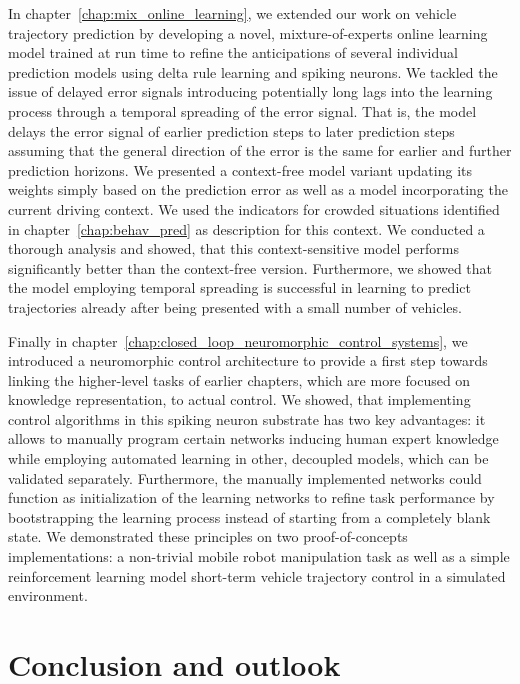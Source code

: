 In chapter~\ref{chap:mix_online_learning}, we extended our work on vehicle trajectory prediction by developing a novel, mixture-of-experts online learning model trained at run time to refine the anticipations of several individual prediction models using delta rule learning and spiking neurons.
We tackled the issue of delayed error signals introducing potentially long lags into the learning process through a temporal spreading of the error signal.
That is, the model delays the error signal of earlier prediction steps to later prediction steps assuming that the general direction of the error is the same for earlier and further prediction horizons.
We presented a context-free model variant updating its weights simply based on the prediction error as well as a model incorporating the current driving context.
We used the indicators for crowded situations identified in chapter~\ref{chap:behav_pred} as description for this context.
We conducted a thorough analysis and showed, that this context-sensitive model performs significantly better than the context-free version.
Furthermore, we showed that the model employing temporal spreading is successful in learning to predict trajectories already after being presented with a small number of vehicles.

Finally in chapter~\ref{chap:closed_loop_neuromorphic_control_systems}, we introduced a neuromorphic control architecture to provide a first step towards linking the higher-level tasks of earlier chapters, which are more focused on knowledge representation, to actual control. 
We showed, that implementing control algorithms in this spiking neuron substrate has two key advantages: it allows to manually program certain networks inducing human expert knowledge while employing automated learning in other, decoupled models, which can be validated separately.
Furthermore, the manually implemented networks could function as initialization of the learning networks to refine task performance by bootstrapping the learning process instead of starting from a completely blank state.
We demonstrated these principles on two proof-of-concepts implementations: a non-trivial mobile robot manipulation task as well as a simple reinforcement learning model short-term vehicle trajectory control in a simulated environment.

\section{Conclusion and outlook}%
\label{sec:conclusion_and_outlook}


